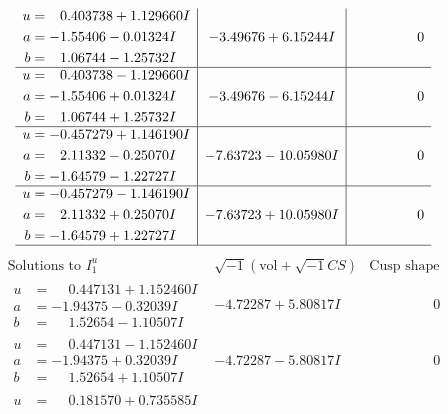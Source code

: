 \documentclass[1p]{elsarticle_modified}
\theoremstyle{definition}
\newcommand{\I}{\sqrt{-1}}
\begin{document}
$$\begin{array}{c|c|c}
\begin{aligned}
u &= \phantom{-}0.403738 + 1.129660 I \\
a &= -1.55406 - 0.01324 I \\
b &= \phantom{-}1.06744 - 1.25732 I\end{aligned}
 & -3.49676 + 6.15244 I & \phantom{-0.000000 } 0 \\ \hline\begin{aligned}
u &= \phantom{-}0.403738 - 1.129660 I \\
a &= -1.55406 + 0.01324 I \\
b &= \phantom{-}1.06744 + 1.25732 I\end{aligned}
 & -3.49676 - 6.15244 I & \phantom{-0.000000 } 0 \\ \hline\begin{aligned}
u &= -0.457279 + 1.146190 I \\
a &= \phantom{-}2.11332 - 0.25070 I \\
b &= -1.64579 - 1.22727 I\end{aligned}
 & -7.63723 - 10.05980 I & \phantom{-0.000000 } 0 \\ \hline\begin{aligned}
u &= -0.457279 - 1.146190 I \\
a &= \phantom{-}2.11332 + 0.25070 I \\
b &= -1.64579 + 1.22727 I\end{aligned}
 & -7.63723 + 10.05980 I & \phantom{-0.000000 } 0\\
 \hline 
 \end{array}$$\newpage$$\begin{array}{c|c|c}  
\text{Solutions to }I^u_{1}& \I (\text{vol} + \sqrt{-1}CS) & \text{Cusp shape}\\
 \hline 
\begin{aligned}
u &= \phantom{-}0.447131 + 1.152460 I \\
a &= -1.94375 - 0.32039 I \\
b &= \phantom{-}1.52654 - 1.10507 I\end{aligned}
 & -4.72287 + 5.80817 I & \phantom{-0.000000 } 0 \\ \hline\begin{aligned}
u &= \phantom{-}0.447131 - 1.152460 I \\
a &= -1.94375 + 0.32039 I \\
b &= \phantom{-}1.52654 + 1.10507 I\end{aligned}
 & -4.72287 - 5.80817 I & \phantom{-0.000000 } 0 \\ \hline\begin{aligned}
u &= \phantom{-}0.181570 + 0.735585 I \\

\end{aligned}
\end{array}$$
\end{document}
